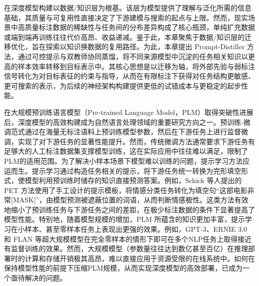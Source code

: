 \documentclass[../main.tex]{subfiles}
\begin{document}


在深度模型构建以数据/知识层为根基。该层为模型提供了理解与泛化所需的信息基础，其质量与可复用性直接决定了下游建模与搜索的起点与上限。然而，现实场景中高质量标注数据的稀缺性与任务间的分布差异构成了核心瓶颈，单纯扩充数据或端到端再训练往往代价高昂、收益递减。鉴于此，本章聚焦于数据/知识层的迁移优化，旨在探索以知识换数据的复用路径。为此，本章提出 Prompt-Distiller 方法，通过可控提示与双教师协同蒸馏，将不同来源模型中沉淀的任务相关知识以更高的样本效率转移到目标表示中。其核心思想是以迁移为轴，将外部先验与弱标注信号转化为对目标表征的约束与指导，从而在有限标注下获得对任务结构更敏感、更可搜索的表示，为后续的神经架构构建提供更低的试错成本与更稳定的起步性能。

在大规模预训练语言模型（Pre-trained Language Model，PLM）取得突破性进展后，深度模型的高效构建成为自然语言处理领域的重要研究方向之一。预训练-微调范式通过在海量无标注语料上预训练模型参数，然后在下游任务上进行监督微调，实现了对下游任务的显著性能提升。然而，传统微调方法通常要求下游任务有足够大的人工标注数据集支撑模型训练，这在实际应用中往往难以满足，限制了PLM的适用范围。为了解决小样本场景下模型难以训练的问题，提示学习方法应运而生。提示学习通过构造任务相关的提示，将下游任务统一转换为完形填空形式，使模型利用预训练时储存的知识直接预测答案。例如，Schick 等人提出的 PET 方法使用了手工设计的提示模板，将情感分类任务转化为填空句“这部电影非常[MASK]”，由模型预测被遮蔽位置的词语，从而判断情感极性。这类方法有效地缩小了预训练任务与下游任务之间的差距，在极少标注数据的条件下显著提高了模型性能。特别地，随着模型规模的增加，PLM 所蕴含的知识更加丰富，提示学习在小样本、甚至零样本任务上表现出更强的效果。例如，GPT-3、ERNIE 3.0 和 FLAN 等超大规模模型在完全零样本的情形下即可在多个NLP任务上取得接近有监督训练的效果。然而，大规模模型（参数量往往达到数亿甚至百亿）在推理部署时的计算和存储开销极其高昂，难以直接应用于资源受限的在线系统中。如何在保持模型性能的前提下压缩PLM规模，从而实现深度模型的高效部署，已成为一个亟待解决的问题。
\end{document}
